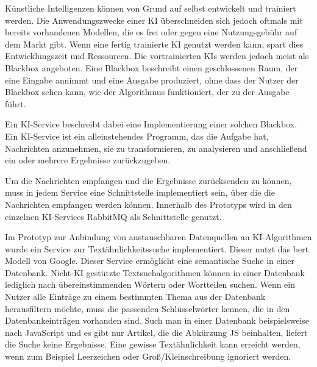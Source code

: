 Künstliche Intelligenzen können von Grund auf selbst entwickelt und trainiert werden. Die Anwendungszwecke einer KI überschneiden sich jedoch oftmals mit bereits vorhandenen Modellen, die es frei oder gegen eine Nutzungsgebühr auf dem Markt gibt. Wenn eine fertig trainierte KI genutzt werden kann, spart dies Entwicklungszeit und Ressourcen. Die vortrainierten KIs werden jedoch meist als Blackbox angeboten. Eine Blackbox beschreibt einen geschlossenen Raum, der eine Eingabe annimmt und eine Ausgabe produziert, ohne dass der Nutzer der Blackbox sehen kann, wie der Algorithmus funktioniert, der zu der Ausgabe führt.  

Ein KI-Service beschreibt dabei eine Implementierung einer solchen Blackbox. Ein KI-Service ist ein alleinstehendes Programm, das die Aufgabe hat, Nachrichten anzunehmen, sie zu transformieren, zu analysieren und anschließend ein oder mehrere Ergebnisse zurückzugeben. 

Um die Nachrichten empfangen und die Ergebnisse zurücksenden zu können, muss in jedem Service eine Schnittstelle implementiert sein, über die die Nachrichten empfangen werden können. Innerhalb des Prototyps wird in den einzelnen KI-Services RabbitMQ als Schnittstelle genutzt.

Im Prototyp zur Anbindung von austauschbaren Datenquellen an KI-Algorithmen wurde ein Service zur Textähnlichkeitssuche implementiert. Dieser nutzt das \ac{bert} Modell von Google. Dieser Service ermöglicht eine semantische Suche in einer Datenbank. Nicht-KI gestützte Textsuchalgorithmen können in einer Datenbank lediglich nach übereinstimmenden Wörtern oder Wortteilen suchen. Wenn ein Nutzer alle Einträge zu einem bestimmten Thema aus der Datenbank herausfiltern möchte, muss die passenden Schlüsselwörter kennen, die in den Datenbankeinträgen vorhanden sind. Such man in einer Datenbank beispielsweise nach \glqq JavaScript\grqq{} und es gibt nur Artikel, die die Abkürzung \glqq JS\grqq{} beinhalten, liefert die Suche keine Ergebnisse. Eine gewisse Textähnlichkeit kann erreicht werden, wenn zum Beispiel Leerzeichen oder Groß/Kleinschreibung ignoriert werden. 

